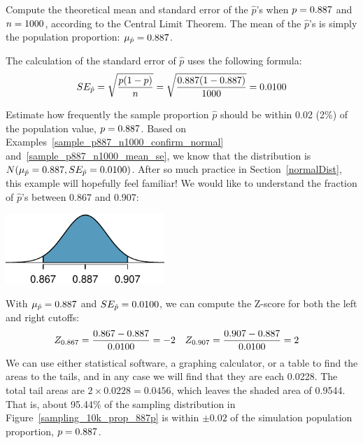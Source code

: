\begin{example}{Compute the theoretical mean and standard error
of the $\hat{p}$'s when
$p = 0.887{}$ and $n = 1000{}$,
according to the
Central Limit Theorem.}\label{sample_p887_n1000_mean_se}
The mean of the $\hat{p}$'s is simply the population proportion:
$\mu_{\hat{p}} = 0.887{}$.

The calculation of the standard error of $\hat{p}$ uses
the following formula:
\begin{align*}
SE_{\hat{p}}
    = \sqrt{\frac{p (1 - p)}{n}}
    = \sqrt{\frac{0.887{} (1 - 0.887{})}{1000}}
    = 0.0100{}
\end{align*}
\end{example}

\begin{example}{Estimate how frequently the sample proportion
$\hat{p}$ should be within 0.02 (2\%) of the population value,
$p = 0.887{}$. Based on
Examples~\ref{sample_p887_n1000_confirm_normal}
and~\ref{sample_p887_n1000_mean_se}, we know that the distribution is
$N(\mu_{\hat{p}} = 0.887{}, SE_{\hat{p}} = 0.0100{})$.}
\label{sampling_10k_prop_887p-prop_from_867_to_907}
After so much practice in Section~\ref{normalDist},
this example will hopefully feel familiar!
We would like to understand the fraction of $\hat{p}$'s
between 0.867 and 0.907:
\begin{center}
\includegraphics[width=60mm]{ch_inference_for_props/figures/p-hat_from_867_and_907/p-hat_from_867_and_907}
\end{center}
With $\mu_{\hat{p}} = 0.887{}$ and
$SE_{\hat{p}} = 0.0100{}$,
we can compute the Z-score for both the left and right cutoffs:
\begin{align*}
Z_{0.867} &= \frac{0.867 - 0.887{}}{0.0100{}} = -2
&Z_{0.907} &= \frac{0.907 - 0.887{}}{0.0100{}} = 2
\end{align*}
We can use either statistical software, a graphing calculator,
or a table to find the areas to the tails, and in any case we
will find that they are each 0.0228. The total tail areas are
$2 \times 0.0228 = 0.0456$, which leaves the shaded area of
0.9544. That is, about 95.44\% of the sampling distribution
in Figure~\ref{sampling_10k_prop_887p} is within $\pm0.02$
of the simulation population proportion, $p = 0.887{}$.
\end{example}

